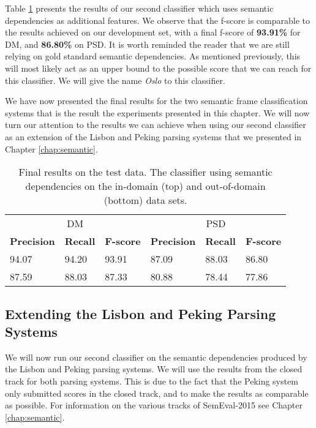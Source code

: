 Table \ref{table:final_results_semantic} presents the results of our second classifier which uses semantic dependencies as additional features. We observe that the f-score is comparable to the results achieved on our development set, with a final f-score of \textbf{93.91\%} for DM, and \textbf{86.80\%} on PSD. It is worth reminded the reader that we are still relying on gold standard semantic dependencies. As mentioned previously, this will most likely act as an upper bound to the possible score that we can reach for this classifier. We will give the name \textit{Oslo} to this classifier.

We have now presented the final results for the two semantic frame classification systems that is the result the experiments presented in this chapter. We will now turn our attention to the results we can achieve when using our second classifier as an extension of the Lisbon and Peking parsing systems that we presented in Chapter \ref{chap:semantic}. 



\begin{table}
    \centering
    \smaller[0.2]
    \begin{tabular}{@{}llllll@{}}
        \toprule
        \multicolumn{3}{c}{DM}
        & \multicolumn{3}{c}{PSD} \\
        \textbf{Precision} & \textbf{Recall} & \textbf{F-score} & \textbf{Precision} & \textbf{Recall} & \textbf{F-score} \\
        \midrule
        94.07 & 94.20 & 93.91 & 87.09 & 88.03 & 86.80 \\
        87.59 & 88.03 & 87.33 & 80.88 & 78.44 & 77.86 \\
        \bottomrule
    \end{tabular}
    \caption{Final results on the test data. The classifier using semantic dependencies on the in-domain (top) and out-of-domain (bottom) data sets.}
    \label{table:final_results_semantic}
\end{table}



 
\subsection{Extending the Lisbon and Peking Parsing Systems}

We will now run our second classifier on the semantic dependencies produced by the Lisbon and Peking parsing systems. We will use the results from the closed track for both parsing systems. This is due to the fact that the Peking system only submitted scores in the closed track, and to make the results as comparable as possible. For information on the various tracks of SemEval-2015 see Chapter \ref{chap:semantic}.

